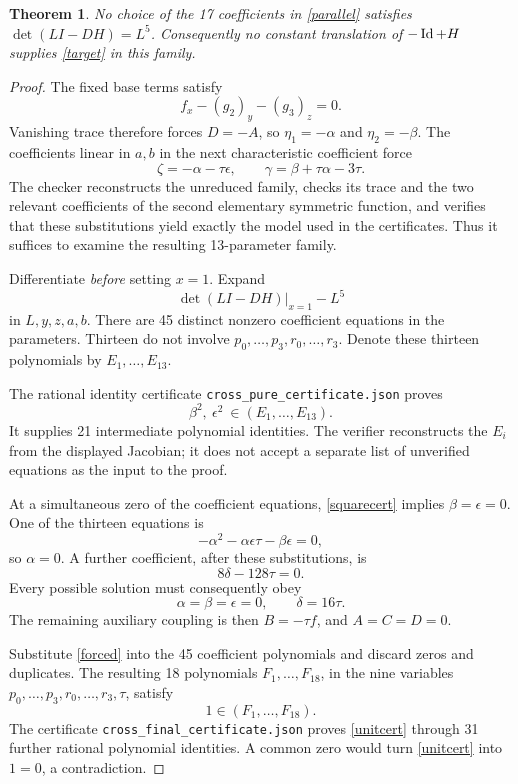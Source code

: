 \documentclass[11pt,a4paper]{article}
\newtheorem{theorem}{Theorem}[section]\newtheorem{proposition}[theorem]{Proposition}\newtheorem{corollary}[theorem]{Corollary}
\theoremstyle{remark}\newtheorem{remark}[theorem]{Remark}
\begin{document}
\begin{theorem}\label{paralleltheorem}
No choice of the 17 coefficients in \eqref{parallel} satisfies
$\det(LI-DH)=L^5$. Consequently no constant translation of $-\operatorname{Id}+H$ supplies
\eqref{target} in this family.
\end{theorem}
\begin{proof}
The fixed base terms satisfy
\[
f_x-(g_2)_y-(g_3)_z=0.
\]
Vanishing trace therefore forces $D=-A$, so
$\eta_1=-\alpha$ and $\eta_2=-\beta$. The coefficients linear in $a,b$ in the
next characteristic coefficient force
\begin{equation}\label{trace2relations}
\zeta=-\alpha-\tau\epsilon,\qquad
\gamma=\beta+\tau\alpha-3\tau.
\end{equation}
The checker reconstructs the unreduced family, checks its trace and the two
relevant coefficients of the second elementary symmetric function, and verifies
that these substitutions yield exactly the model used in the certificates.
Thus it suffices to examine the resulting 13-parameter family.

Differentiate \emph{before} setting $x=1$. Expand
\[
\det(LI-DH)|_{x=1}-L^5
\]
in $L,y,z,a,b$. There are 45 distinct nonzero coefficient equations in the
parameters. Thirteen do not involve $p_0,\ldots,p_3,r_0,\ldots,r_3$.
Denote these thirteen polynomials by $E_1,\ldots,E_{13}$.

The rational identity certificate
\texttt{cross\_pure\_certificate.json} proves
\begin{equation}\label{squarecert}
\beta^2,\ \epsilon^2\ \in (E_1,\ldots,E_{13}).
\end{equation}
It supplies 21 intermediate polynomial identities. The verifier reconstructs
the $E_i$ from the displayed Jacobian; it does not accept a separate list of
unverified equations as the input to the proof.

At a simultaneous zero of the coefficient equations, \eqref{squarecert} implies
$\beta=\epsilon=0$. One of the thirteen equations is
\[
-\alpha^2-\alpha\epsilon\tau-\beta\epsilon=0,
\]
so $\alpha=0$. A further coefficient, after these substitutions, is
\[
8\delta-128\tau=0.
\]
Every possible solution must consequently obey
\begin{equation}\label{forced}
\alpha=\beta=\epsilon=0,\qquad\delta=16\tau.
\end{equation}
The remaining auxiliary coupling is then $B=-\tau f$, and $A=C=D=0$.

Substitute \eqref{forced} into the 45 coefficient polynomials and discard zeros
and duplicates. The resulting 18 polynomials $F_1,\ldots,F_{18}$, in the nine
variables $p_0,\ldots,p_3,r_0,\ldots,r_3,\tau$, satisfy
\begin{equation}\label{unitcert}
1\in(F_1,\ldots,F_{18}).
\end{equation}
The certificate \texttt{cross\_final\_certificate.json} proves \eqref{unitcert}
through 31 further rational polynomial identities. A common zero would turn
\eqref{unitcert} into $1=0$, a contradiction.


\end{proof}
\end{document}
